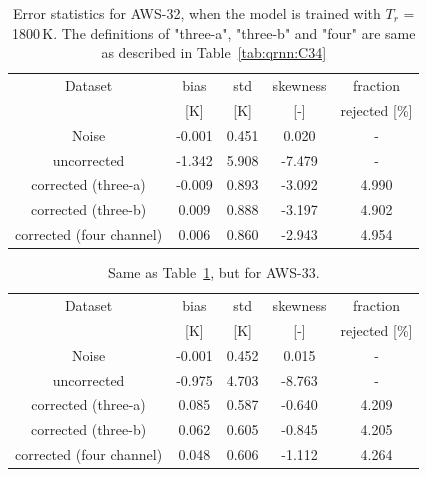 \documentclass[12pt]{article}
\begin{document}
\begin{table}[!p]
	\centering
	\begin{tabular}[b]{c|c|c|c|c}
		Dataset  		  &   bias &   std &   skewness & fraction  \\
		&   [K]  &   [K] & [-] & rejected [\%]\\
		\hline
	Noise                      & -0.001 & 0.451 &              0.020 &      - \\
	uncorrected                & -1.342 & 5.908 &             -7.479 &      - \\
	corrected (three-a) 	   & -0.009 & 0.893 &             -3.092 &      4.990 \\
    corrected (three-b) 	   &  0.009 & 0.888 &             -3.197 &      4.902 \\	
	corrected (four channel)   &  0.006 & 0.860 &             -2.943 &      4.954 \\
		\hline
	\end{tabular}
	\caption{Error statistics for AWS-32, when the model is trained with $T_r$ = 1800\,K. The definitions of "three-a", "three-b" and "four" are same as described in Table~\ref{tab:qrnn:C34} }
	\label{tab:qrnn:C32:Trec:1800}
\end{table}

\begin{table}[!p]
	\centering
	\begin{tabular}[b]{c|c|c|c|c}
		Dataset  		  &   bias &   std &   skewness & fraction  \\
		&   [K]  &   [K] & [-] & rejected [\%]\\
		\hline
	Noise                       & -0.001 & 0.452 &              0.015 &      - \\
	uncorrected                 & -0.975 & 4.703 &             -8.763 &      - \\
	corrected (three-a) 		&  0.085 & 0.587 &             -0.640 &      4.209 \\
	corrected (three-b) 		&  0.062 & 0.605 &             -0.845 &      4.205 \\
	corrected (four channel)    &  0.048 & 0.606 &             -1.112 &      4.264 \\
		\hline
	\end{tabular}
	\caption{ Same as Table~\ref{tab:qrnn:C32:Trec:1800}, but for AWS-33.}
	\label{tab:qrnn:C33:Trec:1800}
\end{table}
\end{document}
